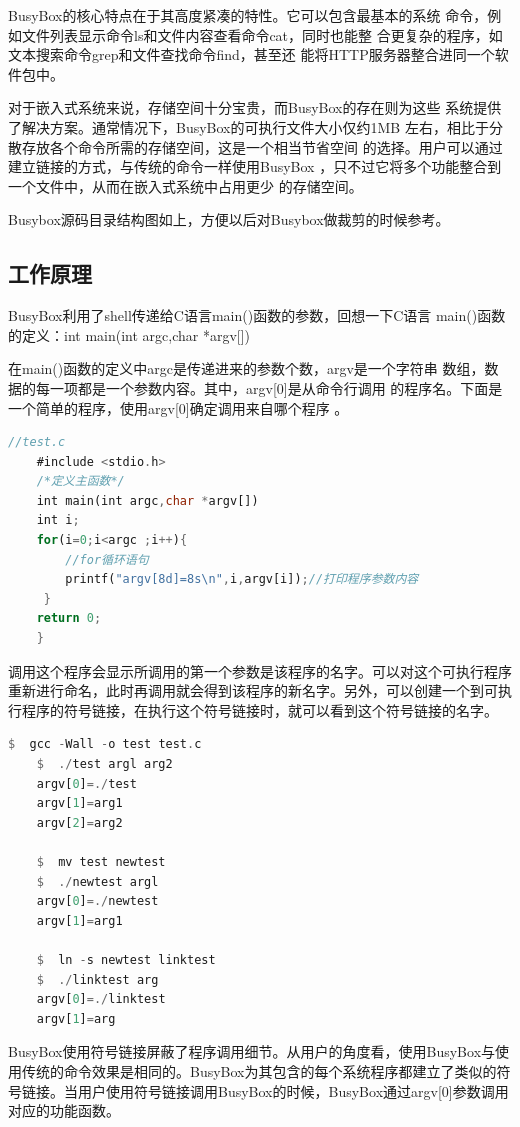 BusyBox的核心特点在于其高度紧凑的特性。它可以包含最基本的系统
命令，例如文件列表显示命令ls和文件内容查看命令cat，同时也能整
合更复杂的程序，如文本搜索命令grep和文件查找命令find，甚至还
能将HTTP服务器整合进同一个软件包中。

对于嵌入式系统来说，存储空间十分宝贵，而BusyBox的存在则为这些
系统提供了解决方案。通常情况下，BusyBox的可执行文件大小仅约1MB
左右，相比于分散存放各个命令所需的存储空间，这是一个相当节省空间
的选择。用户可以通过建立链接的方式，与传统的命令一样使用BusyBox
，只不过它将多个功能整合到一个文件中，从而在嵌入式系统中占用更少
的存储空间。

Busybox源码目录结构图如上，方便以后对Busybox做裁剪的时候参考。

\subsection{工作原理}
BusyBox利用了shell传递给C语言main()函数的参数，回想一下C语言
main()函数的定义：int main(int argc,char *argv[])

在main()函数的定义中argc是传递进来的参数个数，argv是一个字符串
数组，数据的每一项都是一个参数内容。其中，argv[0]是从命令行调用
的程序名。下面是一个简单的程序，使用argv[0]确定调用来自哪个程序
。

\begin{lstlisting}[language=Rust]
	//test.c
	#include <stdio.h>
	/*定义主函数*/
	int main(int argc,char *argv[])
	int i;
	for(i=0;i<argc ;i++){
		//for循环语句
		printf("argv[8d]=8s\n",i,argv[i]);//打印程序参数内容
	 }
	return 0;
    }
\end{lstlisting}

调用这个程序会显示所调用的第一个参数是该程序的名字。可以对这个可执行程序重新进行命名，此时再调用就会得到该程序的新名字。另外，可以创建一个到可执行程序的符号链接，在执行这个符号链接时，就可以看到这个符号链接的名字。

\begin{lstlisting}[language=Rust]
	$  gcc -Wall -o test test.c
	$  ./test argl arg2
	argv[0]=./test
	argv[1]=arg1
	argv[2]=arg2

	$  mv test newtest
	$  ./newtest argl
	argv[0]=./newtest
	argv[1]=arg1

	$  ln -s newtest linktest
	$  ./linktest arg
	argv[0]=./linktest
	argv[1]=arg
	\end{lstlisting}

BusyBox使用符号链接屏蔽了程序调用细节。从用户的角度看，使用BusyBox与使用传统的命令效果是相同的。BusyBox为其包含的每个系统程序都建立了类似的符号链接。当用户使用符号链接调用BusyBox的时候，BusyBox通过argv[0]参数调用对应的功能函数。


